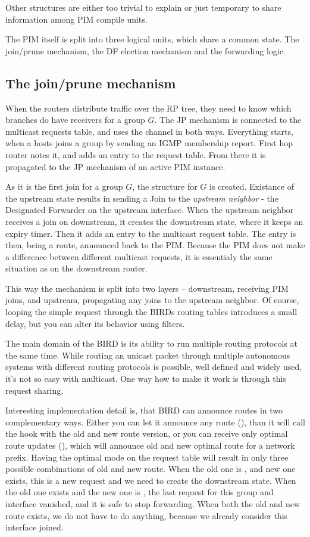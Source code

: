 \noindent Other structures are either too trivial to explain or just temporary
to share information among PIM compile units.

The PIM itself is split into three logical units, which share a common state.
The join/prune mechanism, the DF election mechanism and the forwarding logic.

\subsection{The join/prune mechanism}
When the routers distribute traffic over the RP tree, they need to know which
branches do have receivers for a group $G$. The JP mechanism is connected to
the multicast requests table, and uses the channel in both ways. Everything
starts, when a hosts joins a group by sending an IGMP membership report. First
hop router notes it, and adds an entry to the request table. From there it is
propagated to the JP mechanism of an active PIM instance.

As it is the first join for a group $G$, the  structure for $G$ is
created. Existance of the upstream state results in sending a Join to the
\emph{upstream neighbor} - the Designated Forwarder on the upstream interface.
When the upstream neighbor receives a join on downstream, it creates the
downstream state, where it keeps an expiry timer. Then it adds an entry to the
multicast request table. The entry is then, being a route, announced back to
the PIM. Because the PIM does not make a difference between different multicast
requests, it is essentialy the same situation as on the downstream router.

\label{why-pim-mreq}
This way the mechanism is split into two layers -- downstream, receiving PIM
joins, and upstream, propagating any joins to the upstream neighbor. Of course,
looping the simple request through the BIRDs routing tables introduces a small
delay, but you can alter its behavior using filters.

The main domain of the BIRD is its ability to run multiple routing protocols at
the same time. While routing an unicast packet through multiple autonomous
systems with different routing protocols is possible, well defined and widely
used, it's not so easy with multicast. One way how to make it work is through
this request sharing.

Interesting implementation detail is, that BIRD can announce routes in two
complementary ways. Either you can let it announce any route (),
than it will call the  hook with the old and new route version,
or you can receive only optimal route updates (), which will
announce old and new optimal route for a network prefix. Having the optimal
mode on the request table will result in only three possible combinations of
old and new route. When the old one is \NULL, and new one exists, this is a new
request and we need to create the downstream state. When the old one exists and
the new one is \NULL, the last request for this group and interface vanished,
and it is safe to stop forwarding. When both the old and new route exists, we
do not have to do anything, because we already consider this interface joined.

